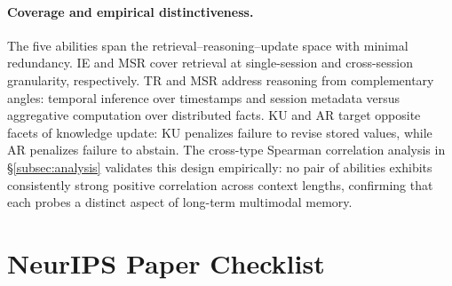 \documentclass{llmxive}
\begin{document}
\paragraph{Coverage and empirical distinctiveness.}
The five abilities span the retrieval--reasoning--update space with minimal redundancy. IE and MSR cover retrieval at single-session and cross-session granularity, respectively. TR and MSR address reasoning from complementary angles: temporal inference over timestamps and session metadata versus aggregative computation over distributed facts. KU and AR target opposite facets of knowledge update: KU penalizes failure to revise stored values, while AR penalizes failure to abstain. The cross-type Spearman correlation analysis in \S\ref{subsec:analysis} validates this design empirically: no pair of abilities exhibits consistently strong positive correlation across context lengths, confirming that each probes a distinct aspect of long-term multimodal memory.

\iffalse %


\section{NeurIPS Paper Checklist}
\label{app:checklist}
\end{document}
